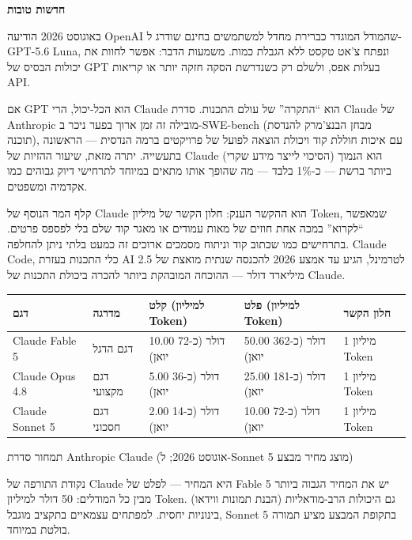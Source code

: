 \textbf{חדשות טובות}\par

באוגוסט 2026 הודיעה OpenAI שהמודל המוגדר כברירת מחדל למשתמשים בחינם שודרג ל-GPT-5.6 Luna, ונפתח צ'אט טקסט ללא הגבלת כמות. משמעות הדבר: אפשר לחוות את יכולות הבסיס של GPT בעלות אפס, ולשלם רק כשנדרשת הסקה חזקה יותר או קריאות API.


אם GPT הוא הכל-יכול, הרי Claude הוא “התקרה” של עולם התכנות. סדרת Claude של Anthropic מובילה זה זמן ארוך בפער ניכר ב-SWE-bench (מבחן הבנצ'מרק להנדסת תוכנה), עם איכות חוללת קוד ויכולת הוצאה לפועל של פרויקטים ברמה הנדסית — הראשונה בתעשייה. יתרה מזאת, שיעור ההזיות של Claude (הסיכוי לייצר מידע שקרי) הוא הנמוך ביותר ברשת — כ-1\% בלבד — מה שהופך אותו מתאים במיוחד לתרחישי דיוק גבוהים כמו אקדמיה ומשפטים.

קלף המר הנוסף של Claude הוא ההקשר הענק: חלון הקשר של מיליון Token, שמאפשר “לקרוא” במכה אחת חוזים של מאות עמודים או מאגר קוד שלם בלי לפספס פרטים. בתרחישים כמו שכתוב קוד וניתוח מסמכים ארוכים זה כמעט בלתי ניתן להחלפה. Claude Code, כלי התכנות בעזרת AI לטרמינל, הגיע עד אמצע 2026 להכנסה שנתית מואצת של 2.5 מיליארד דולר — ההוכחה המובהקת ביותר להכרה ביכולת התכנות של Claude.

\begin{center}
\begin{tabularx}{\linewidth}{|X|X|X|X|X|}
\hline
\textbf{דגם} & \textbf{מדרגה} & \textbf{קלט (למיליון Token)} & \textbf{פלט (למיליון Token)} & \textbf{חלון הקשר} \tabularnewline
\hline
Claude Fable 5 & דגם הדגל & 10.00 דולר (כ-72 יואן) & 50.00 דולר (כ-362 יואן) & 1 מיליון Token \tabularnewline
Claude Opus 4.8 & דגם מקצועי & 5.00 דולר (כ-36 יואן) & 25.00 דולר (כ-181 יואן) & 1 מיליון Token \tabularnewline
Claude Sonnet 5 & דגם חסכוני & 2.00 דולר (כ-14 יואן) & 10.00 דולר (כ-72 יואן) & 1 מיליון Token \tabularnewline
\hline
\end{tabularx}
\end{center}

\begin{center}\small\color{gray}תמחור סדרת Anthropic Claude (אוגוסט 2026; ל-Sonnet 5 מוצג מחיר מבצע)\end{center}

נקודת התורפה של Claude היא המחיר — לפלט של Fable 5 יש את המחיר הגבוה ביותר מבין כל המודלים: 50 דולר למיליון Token. גם היכולות הרב-מודאליות (הבנת תמונות ווידאו) בינוניות יחסית. למפתחים עצמאיים בתקציב מוגבל, Sonnet 5 בתקופת המבצע מציע תמורה בולטת במיוחד.


